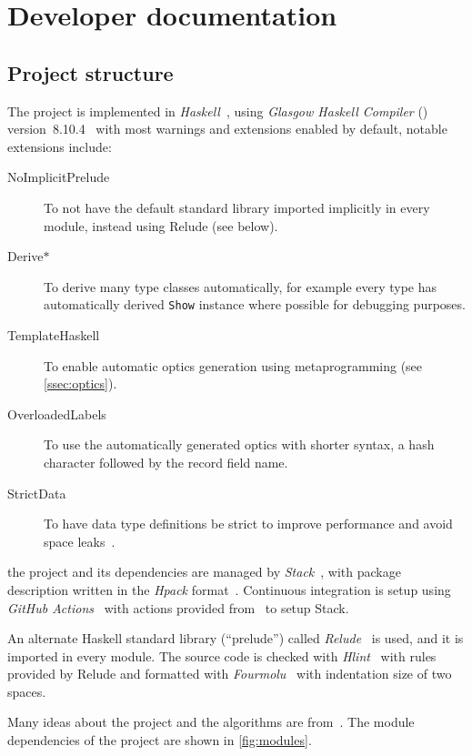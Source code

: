 \chapter{Developer documentation}\label{ch:devdocs}

\section{Project structure}\label{sec:project}

The project is implemented in \emph{Haskell}~\cite{haskell2010}, using
\emph{Glasgow Haskell Compiler} () version~8.10.4~\cite{ghc} with most
warnings and extensions enabled by default, notable extensions include:
\begin{description}
  \item[NoImplicitPrelude] To not have the default standard library imported
    implicitly in every module, instead using Relude (see below).
  \item[Derive\(*\)] To derive many type classes automatically, for example
    every type has automatically derived \texttt{Show} instance where
    possible for debugging purposes.
  \item[TemplateHaskell] To enable automatic optics generation using
    metaprogramming (see \cref{ssec:optics}).
  \item[OverloadedLabels] To use the automatically generated optics with shorter
    syntax, a hash character followed by the record field name.
  \item[StrictData] To have data type definitions be strict to improve
    performance and avoid space leaks~\cite{spaceleak}.
\end{description}

the project and its dependencies are managed by \emph{Stack}~\cite{stack}, with
package description written in the \emph{Hpack} format~\cite{hpack}. Continuous
integration is setup using \emph{GitHub Actions}~\cite{actions} with actions
provided from~\cite{actions-Haskell} to setup Stack.

An alternate Haskell standard library (\enquote{prelude}) called
\emph{Relude}~\cite{relude} is used, and it is imported in every module. The
source code is checked with \emph{Hlint}~\cite{hlint} with rules provided by
Relude and formatted with \emph{Fourmolu}~\cite{fourmolu} with indentation size
of two spaces.

Many ideas about the project and the algorithms are from~\cite{elabzoo}. The
module dependencies of the project are shown in \cref{fig:modules}.


